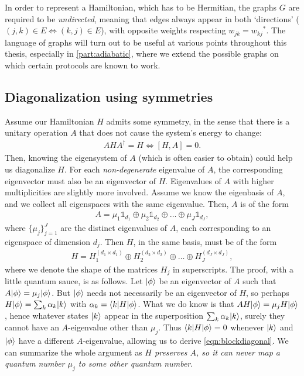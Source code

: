 In order to represent a Hamiltonian, which has to be Hermitian, the graphs $G$ are required to be \emph{undirected}, meaning that edges always appear in both `directions' ($(j,k) \in E \iff (k,j) \in E$), with opposite weights respecting $w_{jk} = {w_{kj}}^*$. The language of graphs will turn out to be useful at various points throughout this thesis, especially in \cref{part:adiabatic}, where we extend the possible graphs on which certain protocols are known to work.  



\subsection{Diagonalization using symmetries}
Assume our Hamiltonian $H$ admits some symmetry, in the sense that there is a unitary operation $A$ that does not cause the system's energy to change:
\begin{align}
A H A^\dagger = H   \iff [H,A] = 0.
\end{align}
Then, knowing the eigensystem of $A$ (which is often easier to obtain) could help us diagonalize $H$. For each \emph{non-degenerate} eigenvalue of $A$, the corresponding eigenvector must also be an eigenvector of $H$. Eigenvalues of $A$ with higher multiplicities are slightly more involved. Assume we know the eigenbasis of $A$, and we collect all eigenspaces with the same eigenvalue. Then, $A$ is of the form 
\begin{align*}
A = \mu_{1} \mathds{1}_{d_1} \oplus \mu_2 \mathds{1}_{d_2} \oplus \ldots \oplus \mu_J \mathds{1}_{d_J},
\end{align*}
where $\{ \mu_j \}_{j=1}^J$ are the distinct eigenvalues of $A$, each corresponding to an eigenspace of dimension $d_j$. Then $H$, in the same basis, must be of the form
\begin{align}
H = H_1^{(d_1 \times d_1)} \oplus H_2^{(d_2 \times d_2)} \oplus \ldots \oplus H_J^{(d_J \times d_J)},
\label{eqn:blockdiagonal}
\end{align}
where we denote the shape of the matrices $H_j$ in superscripts.
The proof, with a little quantum sauce, is as follows. Let $\lvert\phi\rangle$ be an eigenvector of $A$ such that $A \lvert\phi\rangle = \mu_j \lvert\phi\rangle$. But $\lvert\phi\rangle$ needs not necessarily be an eigenvector of $H$, so perhaps $H \lvert\phi\rangle = \sum_k \alpha_k \lvert k\rangle$ with $\alpha_k = \langle k\rvert H \lvert\phi\rangle$. What we do know is that $A H \lvert\phi\rangle = \mu_j H \lvert\phi\rangle$, hence whatever states $\lvert k\rangle$ appear in the superposition $\sum_k \alpha_k \lvert k\rangle$, surely they cannot have an $A$-eigenvalue other than $\mu_j$. Thus $\langle k\rvert H \lvert\phi\rangle = 0$ whenever $\lvert k\rangle$ and $\lvert\phi\rangle$ have a different $A$-eigenvalue, allowing us to derive \cref{eqn:blockdiagonal}. We can summarize the whole argument as \emph{$H$ preserves $A$, so it can never map a quantum number $\mu_j$ to some other quantum number}. 

